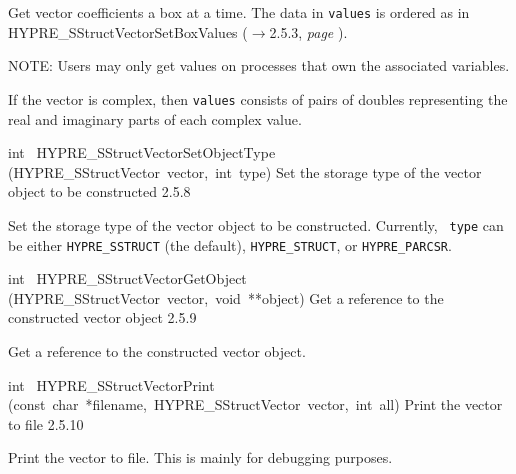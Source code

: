 \documentclass{article}
\begin{document}
\begin{cxxentry}
\begin{cxxentry}
\begin{cxxfunction}
\begin{cxxdoc}
Get vector coefficients a box at a time.  The data in {\tt values} is ordered
as in HYPRE\_SStructVectorSetBoxValues ($\rightarrow$2.5.3, {\em page \pageref{cxx.2.5.3}}).

NOTE: Users may only get values on processes that own the associated
variables.

If the vector is complex, then {\tt values} consists of pairs of doubles
representing the real and imaginary parts of each complex value.


\end{cxxdoc}
\end{cxxfunction}
\begin{cxxfunction}
{int\ }
        {HYPRE\_SStructVectorSetObjectType}
        {(HYPRE\_SStructVector\ vector,\ int\ type)}
        {
Set the storage type of the vector object to be constructed}
        {2.5.8}
\begin{cxxdoc}

Set the storage type of the vector object to be constructed.  Currently, {\tt
type} can be either {\tt HYPRE\_SSTRUCT} (the default), {\tt HYPRE\_STRUCT},
or {\tt HYPRE\_PARCSR}.


\end{cxxdoc}
\end{cxxfunction}
\begin{cxxfunction}
{int\ }
        {HYPRE\_SStructVectorGetObject}
        {(HYPRE\_SStructVector\ vector,\ void\ **object)}
        {
Get a reference to the constructed vector object}
        {2.5.9}
\begin{cxxdoc}

Get a reference to the constructed vector object.


\end{cxxdoc}
\end{cxxfunction}
\begin{cxxfunction}
{int\ }
        {HYPRE\_SStructVectorPrint}
        {(const\ char\ *filename,\ HYPRE\_SStructVector\ vector,\ int\ all)}
        {
Print the vector to file}
        {2.5.10}
\begin{cxxdoc}

Print the vector to file.  This is mainly for debugging purposes.
\end{cxxdoc}
\end{cxxfunction}
\end{cxxentry}
\end{cxxentry}
\end{document}
